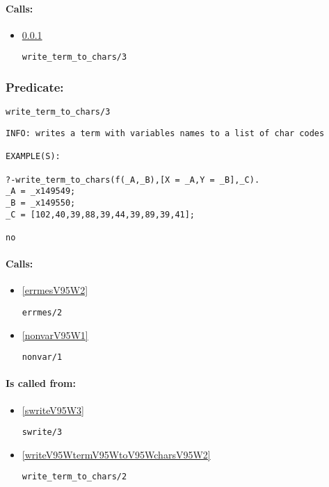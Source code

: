\paragraph{Calls:} 
\begin{itemize}
\item \ref{writeV95WtermV95WtoV95WcharsV95W3} 
\begin{verbatim}
write_term_to_chars/3
\end{verbatim}

\end{itemize}

\subsubsection{Predicate:} \label{writeV95WtermV95WtoV95WcharsV95W3}

\begin{verbatim}
write_term_to_chars/3
\end{verbatim}

{\small \begin{verbatim}
INFO: writes a term with variables names to a list of char codes

EXAMPLE(S):

?-write_term_to_chars(f(_A,_B),[X = _A,Y = _B],_C).
_A = _x149549;
_B = _x149550;
_C = [102,40,39,88,39,44,39,89,39,41];

no

\end{verbatim}}
\paragraph{Calls:} 
\begin{itemize}
\item \ref{errmesV95W2} 
\begin{verbatim}
errmes/2
\end{verbatim}

\item \ref{nonvarV95W1} 
\begin{verbatim}
nonvar/1
\end{verbatim}

\end{itemize}
\paragraph{Is called from:} 
\begin{itemize}
\item \ref{swriteV95W3} 
\begin{verbatim}
swrite/3
\end{verbatim}

\item \ref{writeV95WtermV95WtoV95WcharsV95W2} 
\begin{verbatim}
write_term_to_chars/2
\end{verbatim}

\end{itemize}

